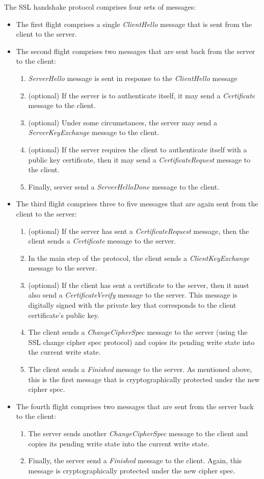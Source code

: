 \documentclass[a4paper,12pt]{report}
\begin{document}
\vspace{5mm} %
The SSL handshake protocol comprises four sets of messages:
\begin{itemize}
\item The first flight comprises a single \emph{ClientHello} message that is sent from the client to the server.
\item The second flight comprises two messages that are sent back from the server to the client:
\begin{enumerate}
\item \emph{ServerHello} message is sent in response to the \emph{ClientHello} message
\item (optional) If the server is to authenticate itself, it may send a \emph{Certificate} message to the client.
\item (optional) Under some circumstances, the server may send a \emph{ServerKeyExchange} message to the client.
\item (optional) If the server requires the client to authenticate itself with a public key certificate, then it may send a \emph{CertificateRequest} message to the client.
\item Finally, server send a \emph{ServerHelloDone} message to the client.
\end{enumerate}
\item The third flight comprises three to five messages that are again sent from the client to the server:
\begin{enumerate}
\item (optional) If the server has sent a \emph{CertificateRequest} message, then the client sends a \emph{Certificate} message to the server.
\item In the main step of the protocol, the client sends a \emph{ClientKeyExchange} message to the server.
\item (optional) If the client has sent a certificate to the server, then it must also send a \emph{CertificateVerify} message to the server. This message is digitally signed with the private key that corresponds to the client certificate's public key.
\item The client sends a \emph{ChangeCipherSpec} message to the server (using the SSL change cipher spec protocol) and copies its pending write state into the current write state.
\item The client sends a \emph{Finished} message to the server. As mentioned above, this is the first message that is cryptographically protected under the new cipher spec.
\end{enumerate}
\item The fourth flight comprises two messages that are sent from the server back to the client:
\begin{enumerate}
\item The server sends another \emph{ChangeCipherSpec} message to the client and copies its pending write state into the current write state.
\item Finally, the server send a \emph{Finished} message to the client. Again, this message is cryptographically protected under the new cipher spec.


\end{enumerate}
\end{itemize}
\end{document}
